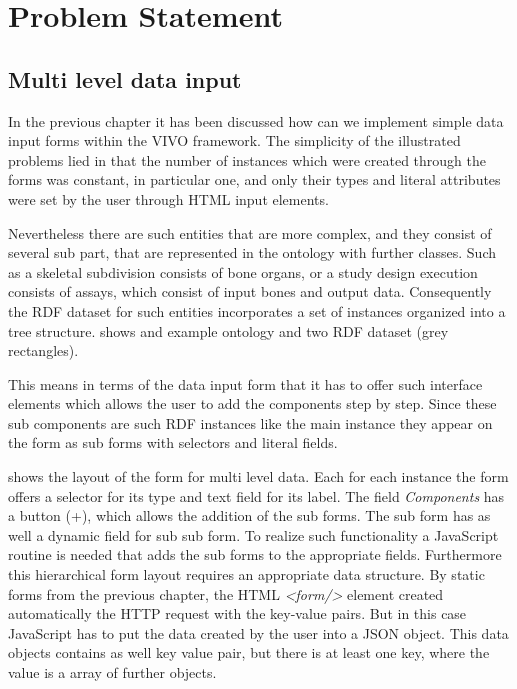 \chapter{Problem Statement}


\section{Multi level data input}


In the previous chapter it has been discussed how can we implement simple data input forms within the VIVO framework. The simplicity of the illustrated problems lied in that the number of instances which were created through the forms was constant, in particular one, and only their types and literal attributes were set by the user through HTML input elements. 


Nevertheless there are such entities that are more complex, and they consist of several sub part, that are represented in the ontology with further classes. Such as a skeletal subdivision consists of bone organs, or a study design execution consists of assays, which consist of input bones and output data. Consequently the RDF dataset for such entities incorporates a set of instances organized into a tree structure.  shows and example ontology and two RDF dataset (grey rectangles).

This means in terms of the data input form that it has to offer such interface elements which allows the user to add the components step by step. Since these sub components are such RDF instances like the main instance they appear on the form as sub forms with selectors and literal fields. 


 shows the layout of the form for multi level data. Each for each instance the form offers a selector for its type and text field for its label. The field \textit{Components} has a button (+), which allows the addition of the sub forms. The sub form has as well a dynamic field for sub sub form. To realize such functionality a JavaScript routine is needed that adds the sub forms to the appropriate fields. 
Furthermore this hierarchical form layout requires an appropriate data structure. By static forms from the previous chapter, the HTML \textit{<form/>} element created automatically the HTTP request with the key-value pairs. But in this case JavaScript has to put the data created by the user into a JSON object. This data objects contains as well key value pair, but there is at least one key, where the value is a array of further objects.


